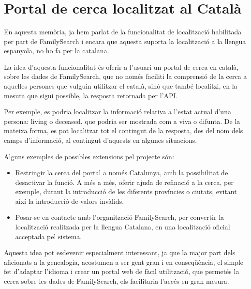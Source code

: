 \section{Portal de cerca localitzat al Català}

    \paragraph{}
    En aquesta memòria, ja hem parlat de la funcionalitat de localització habilitada per part de FamilySearch i encara que aquesta suporta la localització a la llengua espanyola, no ho fa per la catalana.

    La idea d'aquesta funcionalitat és oferir a l'usuari un portal de cerca en català, sobre les dades de FamilySearch, que no només faciliti la comprensió de la cerca a aquelles persones que vulguin utilitzar el català, sinó que també localitzi, en la mesura que sigui possible, la resposta retornada per l'API.

    Per exemple, es podria localitzar la informació relativa a l'estat actual d'una persona: living o deceased, que podria ser mostrada com a viva o difunta. De la mateixa forma, es pot localitzar tot el contingut de la resposta, des del nom dels camps d'informació, al contingut d'aquests en algunes situacions.

    Alguns exemples de possibles extensions pel projecte són:

    \begin{itemize}
        \item Restringir la cerca del portal a només Catalunya, amb la possibilitat de desactivar la funció. A més a més, oferir ajuda de refinació a la cerca, per exemple, durant la introducció de les diferents províncies o ciutats, evitant així la introducció de valors invàlids.
        \item Posar-se en contacte amb l'organització FamilySearch, per convertir la lo\-ca\-lit\-za\-ció realitzada per la llengua Catalana, en una localització oficial acceptada pel sistema.
    \end{itemize}

    Aquesta idea pot esdevenir especialment interessant, ja que la major part dels aficionats a la genealogia, acostumen a ser gent gran i en conseqüència, el simple fet d'adaptar l'idioma i crear un portal web de fàcil utilització, que permetés la cerca sobre les dades de FamilySearch, els facilitaria l'accés en gran mesura.
